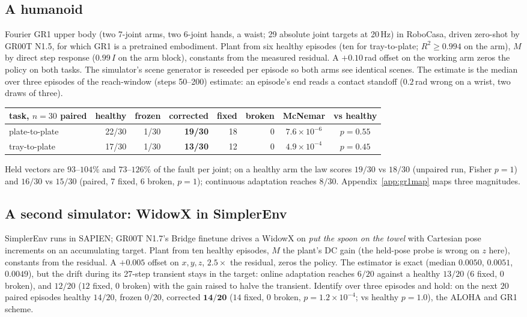 \documentclass{article}
\begin{document}
\subsection{A humanoid}
\label{sec:gr1}
Fourier GR1 upper body (two 7-joint arms, two 6-joint hands, a waist; 29 absolute joint
targets at 20\,Hz) in RoboCasa, driven zero-shot by GR00T N1.5, for which GR1 is a
pretrained embodiment. Plant from six healthy episodes
(ten for tray-to-plate; $R^2\ge0.994$ on the arm), $M$ by direct step response ($0.99\,I$ on the arm block),
constants from the measured residual. A $+0.10$\,rad offset on the working arm zeros the
policy on both tasks. The simulator's scene generator is reseeded per episode so both arms
see identical scenes. The estimate is the median over three episodes of the reach-window
(steps 50--200) estimate: an episode's end reads a contact standoff ($0.2$\,rad wrong on a wrist, two draws of three).

\begin{center}\small
\begin{tabular}{lrrrrrcc}
\toprule
task, $n=30$ paired & healthy & frozen & corrected & fixed & broken & McNemar & vs healthy \\
\midrule
plate-to-plate & 22/30 & 1/30 & \textbf{19/30} & 18 & 0 & $7.6\times10^{-6}$ & $p=0.55$ \\
tray-to-plate & 17/30 & 1/30 & \textbf{13/30} & 12 & 0 & $4.9\times10^{-4}$ & $p=0.45$ \\
\bottomrule
\end{tabular}
\end{center}

Held vectors are $93$--$104\%$ and $73$--$126\%$ of the fault per joint; on a healthy arm
the law scores $19/30$ vs $18/30$ (unpaired run, Fisher $p=1$) and $16/30$ vs $15/30$ (paired, 7 fixed, 6 broken, $p=1$);
continuous adaptation reaches $8/30$. Appendix~\ref{app:gr1map} maps three magnitudes.

\subsection{A second simulator: WidowX in SimplerEnv}
\label{sec:widowx}
SimplerEnv \citep{li2024simpler} runs in SAPIEN; GR00T N1.7's Bridge finetune drives a
WidowX on \emph{put the spoon on the towel} with Cartesian pose increments on an
accumulating target. Plant from ten healthy episodes, $M$ the plant's DC gain (the held-pose
probe is wrong on $z$ here), constants from the residual. A $+0.005$ offset on $x,y,z$,
$2.5\times$ the residual, zeros the policy. The estimator is exact (median $0.0050$,
$0.0051$, $0.0049$), but the drift during its 27-step transient stays in the target:
online adaptation reaches $6/20$ against a healthy $13/20$ ($6$ fixed, $0$ broken), and
$12/20$ ($12$ fixed, $0$ broken) with the gain raised to halve the transient. Identify over
three episodes and hold: on the next $20$ paired episodes healthy $14/20$, frozen $0/20$,
corrected $\mathbf{14/20}$ ($14$ fixed, $0$ broken, $p=1.2\times10^{-4}$; vs healthy $p=1.0$),
the ALOHA and GR1 scheme.
\end{document}
